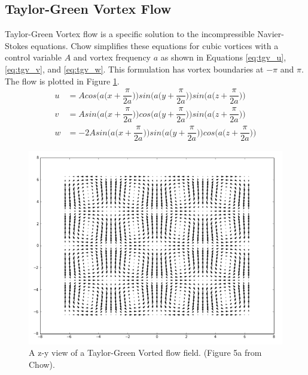 \documentclass[10pt,a4paper,titlepage]{report}
\begin{document}
\subsection{Taylor-Green Vortex Flow}
Taylor-Green Vortex flow is a specific solution to the incompressible Navier-Stokes equations. Chow\cite{achow} simplifies these equations for cubic vortices with a control variable $A$ and vortex frequency $a$ as shown in Equations \ref{eq:tgv_u}, \ref{eq:tgv_v}, and \ref{eq:tgv_w}. This formulation has vortex boundaries at $-\pi$ and $\pi$. The flow is plotted in Figure \ref{fig:tgv_plot}.
\begin{align}
u &= A cos\Big(a\Big(x + \dfrac{\pi}{2a}\Big)\Big)sin\Big(a\Big(y + \dfrac{\pi}{2a}\Big)\Big)sin\Big(a\Big(z + \dfrac{\pi}{2a}\Big)\Big) \label{eq:tgv_u}\\
v &= A sin\Big(a\Big(x + \dfrac{\pi}{2a}\Big)\Big)cos\Big(a\Big(y + \dfrac{\pi}{2a}\Big)\Big)sin\Big(a\Big(z + \dfrac{\pi}{2a}\Big)\Big) \label{eq:tgv_v}\\
w &= -2A sin\Big(a\Big(x + \dfrac{\pi}{2a}\Big)\Big)sin\Big(a\Big(y + \dfrac{\pi}{2a}\Big)\Big)cos\Big(a\Big(z + \dfrac{\pi}{2a}\Big)\Big) \label{eq:tgv_w}
\end{align}
\begin{figure}[!htb]
\centering
\includegraphics[scale=0.65]{figures/tgv_plot.png}
\caption{A z-y view of a Taylor-Green Vorted flow field. (Figure 5a from Chow\cite{achow}).}
\label{fig:tgv_plot}
\end{figure}
\end{document}
